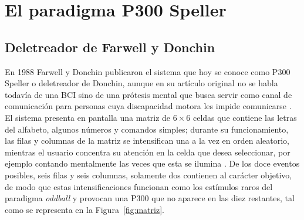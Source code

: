 \section[EL PARADIGMA P300 SPELLER]{El paradigma P300 Speller}
\label{sec:speller}

\subsection{Deletreador de Farwell y Donchin}

En 1988 Farwell y Donchin publicaron el sistema que hoy se conoce como P300 Speller o deletreador
de Donchin, aunque en su artículo original no se habla todavía de una BCI sino de una prótesis
mental que busca servir como canal de comunicación para personas cuya discapacidad motora les
impide comunicarse \cite{farwell1988}. El sistema presenta en pantalla una matriz de $6\times6$
celdas que contiene las letras del alfabeto, algunos números y comandos simples; durante su
funcionamiento, las filas y columnas de la matriz se intensifican una a la vez en orden aleatorio,
mientras el usuario concentra su atención en la celda que desea seleccionar, por ejemplo contando
mentalmente las veces que esta se ilumina \cite{farwell1988}. De los doce eventos posibles, seis
filas y seis columnas, solamente dos contienen al carácter objetivo, de modo que estas
intensificaciones funcionan como los estímulos raros del paradigma \textit{oddball} y provocan una
P300 que no aparece en las diez restantes, tal como se representa en la Figura~\ref{fig:matriz}.

